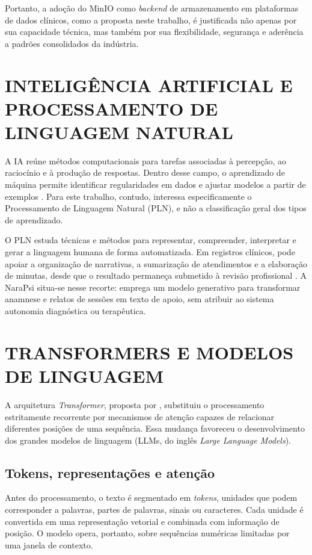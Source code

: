 Portanto, a adoção do MinIO como \textit{backend} de armazenamento em plataformas de dados clínicos, como a proposta neste trabalho, é justificada não apenas por sua capacidade técnica, mas também por sua flexibilidade, segurança e aderência a padrões consolidados da indústria.


\section{INTELIGÊNCIA ARTIFICIAL E PROCESSAMENTO DE LINGUAGEM NATURAL}

A IA reúne métodos computacionais para tarefas associadas à percepção, ao raciocínio e à produção de respostas. Dentro desse campo, o aprendizado de máquina permite identificar regularidades em dados e ajustar modelos a partir de exemplos \cite{russell2013inteligencia,ludermir2021inteligencia}. Para este trabalho, contudo, interessa especificamente o Processamento de Linguagem Natural (PLN), e não a classificação geral dos tipos de aprendizado.

O PLN estuda técnicas e métodos para representar, compreender, interpretar e gerar a linguagem humana de forma automatizada. Em registros clínicos, pode apoiar a organização de narrativas, a sumarização de atendimentos e a elaboração de minutas, desde que o resultado permaneça submetido à revisão profissional \cite{stryker2024o}. A NaraPsi situa-se nesse recorte: emprega um modelo generativo para transformar anamnese e relatos de sessões em texto de apoio, sem atribuir ao sistema autonomia diagnóstica ou terapêutica.

\section{TRANSFORMERS E MODELOS DE LINGUAGEM}

A arquitetura \textit{Transformer}, proposta por , substituiu o processamento estritamente recorrente por mecanismos de atenção capazes de relacionar diferentes posições de uma sequência. Essa mudança favoreceu o desenvolvimento dos grandes modelos de linguagem (LLMs, do inglês \textit{Large Language Models}).

\subsection{Tokens, representações e atenção}

Antes do processamento, o texto é segmentado em \textit{tokens}, unidades que podem corresponder a palavras, partes de palavras, sinais ou caracteres. Cada unidade é convertida em uma representação vetorial e combinada com informação de posição. O modelo opera, portanto, sobre sequências numéricas limitadas por uma janela de contexto.

